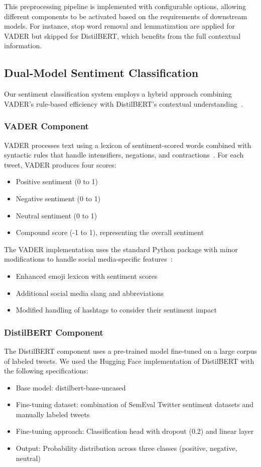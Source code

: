 \documentclass[conference]{IEEEtran}
\begin{document}
This preprocessing pipeline is implemented with configurable options, allowing different components to be activated based on the requirements of downstream models. For instance, stop word removal and lemmatization are applied for VADER but skipped for DistilBERT, which benefits from the full contextual information.


\subsection{Dual-Model Sentiment Classification}

Our sentiment classification system employs a hybrid approach combining VADER's rule-based efficiency with DistilBERT's contextual understanding~\cite{hex2023vader}.

\subsubsection{VADER Component}
VADER processes text using a lexicon of sentiment-scored words combined with syntactic rules that handle intensifiers, negations, and contractions~\cite{hex2023vader, githubVADER}. For each tweet, VADER produces four scores:
\begin{itemize}
    \item Positive sentiment (0 to 1)
    \item Negative sentiment (0 to 1)
    \item Neutral sentiment (0 to 1)
    \item Compound score (-1 to 1), representing the overall sentiment
\end{itemize}

The VADER implementation uses the standard Python package with minor modifications to handle social media-specific features~\cite{hex2023vader}:
\begin{itemize}
    \item Enhanced emoji lexicon with sentiment scores
    \item Additional social media slang and abbreviations
    \item Modified handling of hashtags to consider their sentiment impact
\end{itemize}

\subsubsection{DistilBERT Component}
The DistilBERT component uses a pre-trained model fine-tuned on a large corpus of labeled tweets. We used the Hugging Face implementation of DistilBERT with the following specifications:
\begin{itemize}
    \item Base model: distilbert-base-uncased
    \item Fine-tuning dataset: combination of SemEval Twitter sentiment datasets and manually labeled tweets
    \item Fine-tuning approach: Classification head with dropout (0.2) and linear layer
    \item Output: Probability distribution across three classes (positive, negative, neutral)
\end{itemize}
\end{document}
